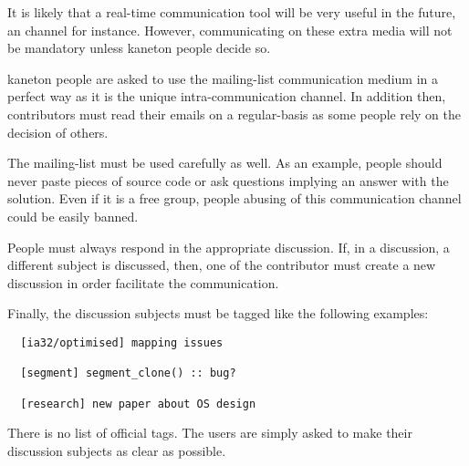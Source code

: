 It is likely that a real-time communication tool will be very useful in the
future, an  channel for instance. However, communicating on
these extra media will not be mandatory unless kaneton people decide so.

kaneton people are asked to use the mailing-list communication medium
in a perfect way as it is the unique intra-communication channel. In
addition then, contributors must read their emails on a regular-basis
as some people rely on the decision of others.

The  mailing-list must be used carefully as well. As
an example, people should never paste pieces of source code or ask
questions implying an answer with the solution. Even if it is a free
group, people abusing of this communication channel could be easily banned.

People must always respond in the appropriate discussion. If, in a discussion,
a different subject is discussed, then, one of the contributor must create
a new discussion in order facilitate the communication.

Finally, the discussion subjects must be tagged like the following examples:

\begin{verbatim}
  [ia32/optimised] mapping issues

  [segment] segment_clone() :: bug?

  [research] new paper about OS design
\end{verbatim}

There is no list of official tags. The users are simply asked to make
their discussion subjects as clear as possible.

